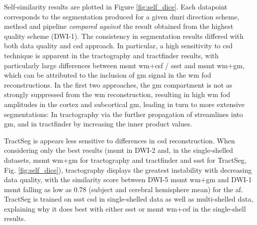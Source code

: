 Self-similarity results are plotted in Figure \ref{fig:self_dice}.
Each datapoint corresponds to the segmentation produced for a given \gls{dmri} direction scheme, method and pipeline \textit{compared against} the result obtained from the highest quality scheme (DWI-1).
The consistency in segmentation results differed with both data quality and \gls{csd} approach.
In particular, a high sensitivity to \gls{csd} technique is apparent in the tractography and tractfinder results, with particularly large differences between \gls{msmt} \gls{wm}+\gls{csf} / \gls{ssst} and \gls{msmt} \gls{wm}+\gls{gm}, which can be attributed to the inclusion of \gls{gm} signal in the \gls{wm} \gls{fod} reconstructions.
In the first two approaches, the \gls{gm} compartment is not as strongly suppressed from the \gls{wm} reconstruction, resulting in high \gls{wm} \gls{fod} amplitudes in the cortex and subcortical \gls{gm}, leading in turn to more extensive segmentations:
In tractography via the further propagation of streamlines into \gls{gm}, and in tractfinder by increasing the inner product values.

TractSeg is appears less sensitive to differences in \gls{csd} reconstruction.
When considering only the best results (\gls{msmt} in DWI-2 and, in the single-shelled datasets, \gls{msmt} \gls{wm}+\gls{gm} for tractography and tractfinder and \gls{ssst} for TractSeg, Fig. \ref{fig:self_dice}), tractography displays the greatest instability with decreasing data quality, with the similarity score between DWI-5 \gls{msmt} \gls{wm}+\gls{gm} and DWI-1 \gls{msmt} falling as low as 0.78 (subject and cerebral hemisphere mean) for the \gls{af}.
TractSeg is trained on \gls{ssst} \gls{csd} in single-shelled data as well as multi-shelled data, explaining why it does best with either \gls{ssst} or \gls{msmt} \gls{wm}+\gls{csf} in the single-shell results.


